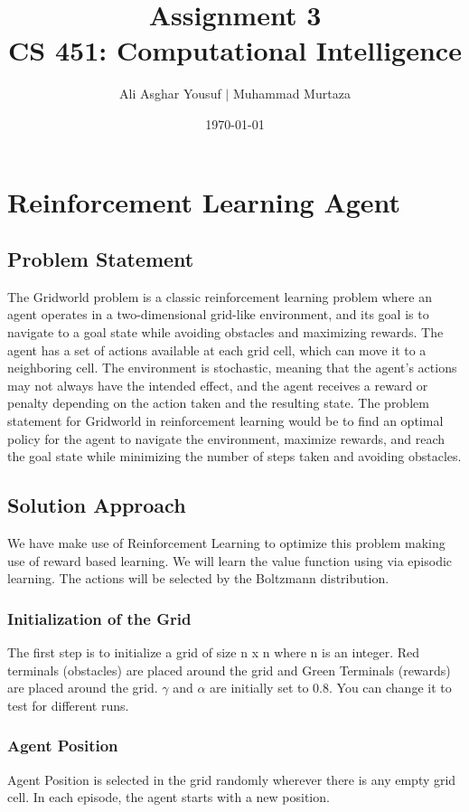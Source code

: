 \documentclass{article}
\title{Assignment 3\\CS 451: Computational Intelligence}
\author{Ali Asghar Yousuf $\mid$ Muhammad Murtaza}
\date{\today}
\begin{document}
\maketitle

\section{Reinforcement Learning Agent}

\subsection{Problem Statement}
The Gridworld problem is a classic reinforcement learning problem where an agent operates in a two-dimensional grid-like environment, and its goal is to navigate to a goal state while avoiding obstacles and maximizing rewards. The agent has a set of actions available at each grid cell, which can move it to a neighboring cell. The environment is stochastic, meaning that the agent's actions may not always have the intended effect, and the agent receives a reward or penalty depending on the action taken and the resulting state. The problem statement for Gridworld in reinforcement learning would be to find an optimal policy for the agent to navigate the environment, maximize rewards, and reach the goal state while minimizing the number of steps taken and avoiding obstacles.

\subsection{Solution Approach}
We have make use of Reinforcement Learning to optimize this problem making use of reward based learning. We will learn the value function using via episodic learning. The actions will be selected by the Boltzmann distribution.

\subsubsection{Initialization of the Grid}
The first step is to initialize a grid of size n x n where n is an integer. Red terminals (obstacles) are placed around the grid and Green Terminals (rewards) are placed around the grid. $\gamma$ and $\alpha$ are initially set to 0.8. You can change it to test for different runs.

\subsubsection{Agent Position}
Agent Position is selected in the grid randomly wherever there is any empty grid cell. In each episode, the agent starts with a new position.
\end{document}

